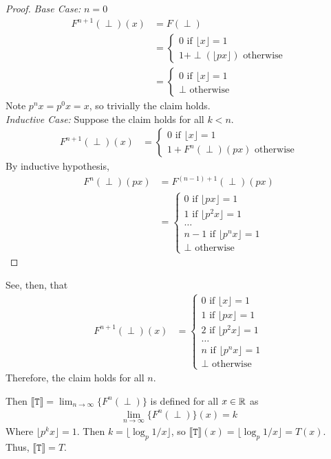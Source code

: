 \begin{proof}

\emph{Base Case: } $n = 0$
\begin{align*}
F^{n+1}(\perp)(x) &= F(\perp) \\
&= 
\begin{cases}
0 \text{ if }\lfloor x \rfloor=1 \\
1 + \perp(\lfloor px \rfloor) \text{ otherwise}
\end{cases} \\
&=
\begin{cases}
0 \text{ if } \lfloor x \rfloor=1 \\
\perp \text{ otherwise}
\end{cases} 
\end{align*}
Note $p^{n}x = p^0x = x$, so trivially the claim holds. \\
\emph{Inductive Case: } Suppose the claim holds for all $k < n$.
\begin{align*}
F^{n+1}(\perp)(x) &=  
\begin{cases}
0 \text{ if } \lfloor x \rfloor =1 \\
1 + F^{n}(\perp)(px) \text{ otherwise}
\end{cases} 
\end{align*}
By inductive hypothesis,
\begin{align*}
F^{n}(\perp)(px) &= F^{(n-1) + 1}(\perp)(px) \\
&=  
 \begin{cases}
 0 \text{ if } \lfloor px \rfloor = 1 \\
 1 \text{ if } \lfloor  p^2x \rfloor = 1  \\
 \dots \\
 n - 1 \text{ if }  \lfloor p^{n}x \rfloor =1  \\
 \perp \text{ otherwise}
 \end{cases}
 \end{align*}
\end{proof}
See, then, that
\begin{align*}
F^{n+1}(\perp)(x) &=  
\begin{cases}
0 \text{ if } \lfloor x \rfloor =1 \\
1 \text{ if } \lfloor px \rfloor = 1 \\
2 \text{ if } \lfloor p^2x \rfloor = 1  \\
\dots \\
n \text{ if } \lfloor p^{n}x \rfloor = 1  \\
\perp \text{ otherwise } 
\end{cases}
\end{align*}
Therefore, the claim holds for all $n$.

Then $\llbracket \texttt{T} \rrbracket = \lim_{n \to \infty}\{F^n (\perp)\}$ is defined for all $x \in \mathbb{R}$ as
\begin{align*}
\lim_{n \to \infty}\{F^n (\perp)\}(x) = k
\end{align*}
Where $\lfloor p^kx \rfloor =1$. Then $k = \lfloor \log_{p}1/x \rfloor$, so
 $\llbracket \texttt{T} \rrbracket(x) = \lfloor \log_{p}1/x \rfloor= T(x)$. Thus, $\llbracket \texttt{T} \rrbracket = T$.
 




